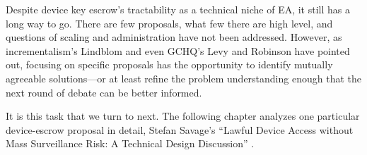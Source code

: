 Despite device key escrow's tractability as a technical niche of \ac{EA}, it still has a long way to go. There are few
proposals, what few there are high level, and questions of scaling and administration have not been addressed. However,
as \ac{incrementalism}'s Lindblom and even \ac{GCHQ}'s Levy and Robinson have pointed out, focusing on specific
proposals has the opportunity to identify mutually agreeable solutions---or at least refine the problem understanding
enough that the next round of debate can be better informed.

It is this task that we turn to next. The following chapter analyzes one particular device-escrow proposal in detail,
Stefan Savage's ``Lawful Device Access without Mass Surveillance Risk: A Technical Design Discussion''
\cite{savage_lawful_2018}.
